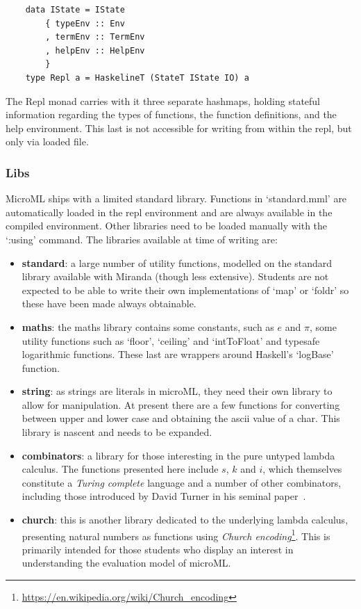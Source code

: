 \documentclass[12pt, a4paper]{report}
\begin{document}
\begin{verbatim}
    data IState = IState
        { typeEnv :: Env
        , termEnv :: TermEnv
        , helpEnv :: HelpEnv
        }
    type Repl a = HaskelineT (StateT IState IO) a
\end{verbatim}

The Repl monad carries with it three separate hashmaps, holding stateful information regarding the
types of functions, the function definitions, and the help environment. This last is not accessible
for writing from within the repl, but only via loaded file.

\subsubsection{Libs}
\label{libs}
MicroML ships with a limited standard library. Functions in `standard.mml' are automatically loaded
in the repl environment and are always available in the compiled environment. Other libraries need
to be loaded manually with the `:using' command. The libraries available at time of writing are:

\begin{itemize}
    \item \textbf{standard}: a large number of utility functions, modelled on the standard library available
        with Miranda (though less extensive). Students are not expected to be able to write their
        own implementations of `map' or `foldr' so these have been made always obtainable.
    \item \textbf{maths}: the maths library contains some constants, such as $e$ and $\pi$, some utility
        functions such as `floor', `ceiling' and `intToFloat' and typesafe logarithmic functions.
        These last are wrappers around Haskell's `logBase' function.
    \item \textbf{string}: as strings are literals in microML, they need their own library to allow for
        manipulation. At present there are a few functions for converting between upper and lower
        case and obtaining the ascii value of a char. This library is nascent and needs to be
        expanded.
    \item \textbf{combinators}: a library for those interesting in the pure untyped lambda calculus. The
        functions presented here include $s$, $k$ and $i$, which themselves constitute a
        \textit{Turing complete} language and a number of other combinators, including those
        introduced by David Turner in his seminal paper~\cite{TUR79a}.
    \item \textbf{church}: this is another library dedicated to the underlying lambda calculus, presenting
        natural numbers as functions using \textit{Church encoding}\footnote{\url{https://en.wikipedia.org/wiki/Church_encoding}}.
        This is primarily intended for those students who display an interest in understanding the
        evaluation model of microML\@.
\end{itemize}
\end{document}
